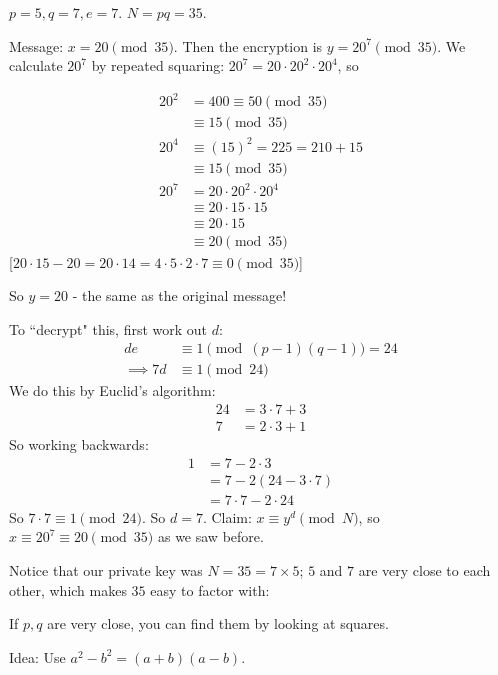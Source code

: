 \documentclass[10pt]{scrartcl}
\begin{document}
\begin{example}
$p  = 5, q = 7, e = 7$. $N = pq = 35$. 

Message: $x = 20 \pmod{35}$. Then the encryption is $y = 20^7 \pmod{35}$. We calculate $20^7$ by repeated squaring: $20^7 = 20\cdot 20^2 \cdot 20^4$, so 

\[
\begin{aligned}
  20^2 &= 400 \equiv 50 \pmod{35}\\
  &\equiv 15 \pmod{35}\\[0.2cm]
  20^4 &\equiv (15)^2 = 225 = 210 + 15\\
  &\equiv 15 \pmod{35}\\[0.2cm]
  20^7 &= 20\cdot 20^2 \cdot 20^4\\
  &\equiv 20\cdot 15 \cdot 15\\
  &\equiv 20 \cdot 15\\
  &\equiv 20 \pmod{35}
\end{aligned}
\]
[$20 \cdot 15 - 20 = 20 \cdot 14 = 4\cdot 5\cdot 2 \cdot 7 \equiv 0 \pmod{35}$]

So $y = 20$ - the same as the original message! 

To ``decrypt" this, first work out $d$: 
\[\begin{aligned}de &\equiv 1 \pmod{(p-1)(q-1)} = 24\\
\implies 7d &\equiv 1 \pmod{24}\end{aligned}\]
We do this by Euclid's algorithm: 
\[
\begin{aligned}
  24 &= 3 \cdot 7 + 3\\
  7&= 2\cdot 3 + 1
\end{aligned}
\]
So working backwards:
\[
\begin{aligned}
  1 &= 7 - 2\cdot 3\\
  &= 7 - 2(24 - 3\cdot 7)\\
  &= 7\cdot 7 - 2 \cdot 24
\end{aligned}
\]
So $7 \cdot 7 \equiv 1 \pmod{24}.$ So $d = 7$. Claim: $x \equiv y^d \pmod{N}$, so $x \equiv 20^7 \equiv 20 \pmod{35}$ as we saw before. 
\end{example}

Notice that our private key was $N = 35 = 7 \times 5$; $5$ and $7$ are very close to each other, which makes $35$ easy to factor with: 


If $p,q$ are very close, you can find them by looking at squares. 

Idea: Use $a^2 - b^2 = (a+b)(a-b)$. 
\end{document}
